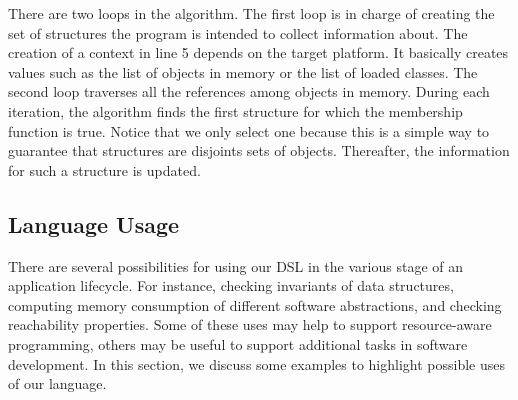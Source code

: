 There are two loops in the algorithm. 
The first loop is in charge of creating the set of structures the program is intended to collect information about.
The creation of a context in line 5 depends on the target platform.
It basically creates values such as the list of objects in memory or the list of loaded classes.
The second loop traverses all the references among objects in memory.
During each iteration, the algorithm finds the first structure for which the membership function is true.
Notice that we only select one because this is a simple way to guarantee that structures are disjoints sets of objects. %
Thereafter, the information for such a structure is updated.



\subsection{Language Usage} \label{sec:dsl-usage-examples}

There are several possibilities for using our DSL in the various stage of an application lifecycle.
For instance, checking invariants of data structures, computing memory consumption of different software abstractions, and checking reachability properties.
Some of these uses may help to support resource-aware programming, others may be useful to support additional tasks in software development.
In this section, we discuss some examples to highlight possible uses of our language.
 
